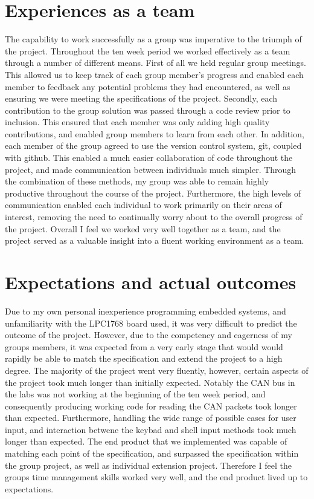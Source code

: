 \section{Experiences as a team}
The capability to work successfully as a group was imperative to the triumph of
the project. 
Throughout the ten week period we worked effectively as a team through a number 
of different means. 
First of all we held regular group meetings. This allowed us to keep track of 
each group member's progress and enabled each member to feedback any potential 
problems they had encountered, as well as ensuring we were meeting the 
specifications of the project. 
Secondly, each contribution to the group solution was passed through a code 
review prior to inclusion. 
This ensured that each member was only adding high 
quality contributions, and enabled group members to learn from each other.
In addition, each member of the group agreed to use the version control system, 
git, coupled with github. This enabled a much easier collaboration of code 
throughout the project, and made communication between individuals much simpler. 
Through the combination of these methods, my group was able to remain highly 
productive throughout the course of the project.
Furthermore, the high levels of communication enabled each individual to work 
primarily on their areas of interest, removing the need to continually worry 
about to the overall progress of the project. 
Overall I feel we worked very well together as a team, and the project served 
as a valuable insight into a fluent working environment as a team. 

\section{Expectations and actual outcomes}

Due to my own personal inexperience programming embedded systems, and 
unfamiliarity with the LPC1768 board used, it was very difficult to predict the 
outcome of the project. 
However, due to the competency and eagerness of my groups members, it was 
expected from a very early stage that would would rapidly be able to match the 
specification and extend the project to a high degree. 
The majority of the project went very fluently, however, certain aspects of the 
project took much longer than initially expected. 
Notably the CAN bus in the labs was not working at the beginning of the ten week
period, and consequently producing working code for reading the CAN packets took 
longer than expected. 
Furthermore, handling the wide range of possible cases for 
user input, and interaction betwene the keybad and shell input methods took much 
longer than expected. 
The end product that we implemented was capable of matching each point of the 
specification, and surpassed the specification within the group project, 
as well as individual extension project. 
Therefore I feel the groups time management skills worked very well, and the end 
product lived up to expectations.

